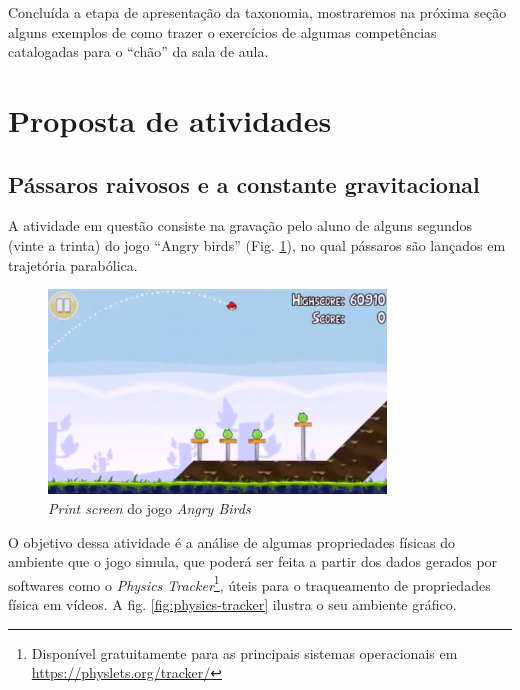 Concluída a etapa de apresentação da taxonomia, mostraremos na próxima seção alguns exemplos de como trazer o exercícios de algumas competências catalogadas para o ``chão'' da sala de aula.

\section{Proposta de atividades}

\subsection{Pássaros raivosos e a constante gravitacional}

A atividade em questão consiste na gravação pelo aluno de alguns segundos (vinte a trinta) do jogo ``Angry birds'' (Fig. \ref{fig:angry-birds}), no qual pássaros são lançados em trajetória parabólica.

\begin{figure}[!htb]
  \caption{\textit{Print screen} do jogo \textit{Angry Birds}}
  \begin{center}
    \includegraphics[width=0.8\textwidth]{imagens/angry-birds}
  \end{center}
  \label{fig:angry-birds}
\end{figure}

O objetivo dessa atividade é a análise de algumas propriedades físicas do ambiente que o jogo simula, que poderá ser feita a partir dos dados gerados por softwares como o \textit{Physics Tracker}\footnote{Disponível gratuitamente para as principais sistemas operacionais em \href{https://physlets.org/tracker/}{https://physlets.org/tracker/}}, úteis para o traqueamento de propriedades física em vídeos. A fig. \ref{fig:physics-tracker} ilustra o seu ambiente gráfico.

